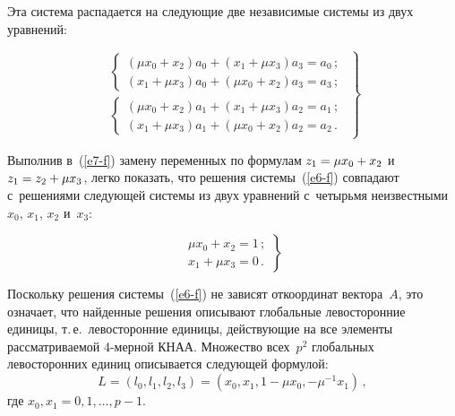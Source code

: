 \begin{multicols}{2}
  Эта система распадается на следующие две независимые системы из двух 
уравнений:

\vspace*{1pt}

\noindent
  \begin{equation}
  \left.
  \begin{array}{l}
  \left\{ 
  \begin{array}{l}
  (\mu x_0+x_2)a_0+(x_1+\mu x_3)a_3=a_0\,;\\[3pt]
  (x_1+\mu x_3)a_0+(\mu x_0+x_2)a_3=a_3\,;
  \end{array}
  \right.\\[12pt]
  \left\{ \begin{array}{l}
  (\mu x_0+x_2)a_1+(x_1+\mu x_3)a_2=a_1\,;\\[3pt]
  (x_1+\mu x_3)a_1+(\mu x_0+x_2)a_2=a_2\,.
  \end{array}
  \right.
  \end{array}
  \right\}
  \label{e7-f}
  \end{equation}
  
  \vspace*{-1pt}
  
  Выполнив в~(\ref{e7-f}) замену переменных по формулам $z_1\hm= \mu 
x_0\hm+x_2$ и~$z_1\hm= z_2\hm+\mu x_3$, легко показать, что решения 
системы~(\ref{e6-f}) совпадают с~решениями следующей системы из двух 
уравнений с~четырьмя неизвестными~$x_0$, $x_1$, $x_2$ и~$x_3$:

\vspace*{1pt}

\noindent
  \begin{equation*}
  \left. 
  \begin{array}{l}
  \mu x_0+x_2=1\,;\\[3pt]
  x_1+\mu x_3=0\,.
  \end{array}
  \right\}
  \end{equation*}
  
  \vspace*{-1pt}
  
  Поскольку решения системы~(\ref{e6-f}) не зависят от\linebreak координат 
вектора~$A$, это означает, что найденные решения описывают глобальные 
левосторонние единицы, т.\,е.\ левосторонние единицы, действующие на все 
элементы рассматриваемой \mbox{4-мер\-ной} КНАА. Множество всех~$p^2$ 
глобальных левосторонних единиц описывается следующей формулой:
  \begin{equation*}
  L=\left( l_0, l_1, l_2, l_3\right) =\left( x_0, x_1, 1-\mu x_0, -\mu^{-1}x_1\right)\,,
  \end{equation*}
где $x_0, x_1=0, 1, \ldots , p-1$.
  

\end{multicols}
